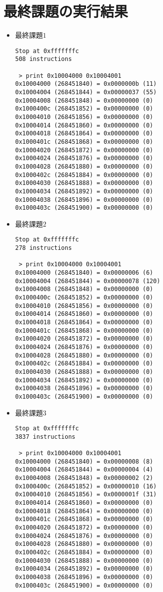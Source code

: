 \documentclass{jarticle}[11pt]
\begin{document}
\section{最終課題の実行結果}
\begin{itemize}
\item 最終課題$1$
\begin{verbatim}
Stop at 0xfffffffc
508 instructions

 > print 0x10004000 0x10004001
0x10004000 (268451840) = 0x0000000b (11)
0x10004004 (268451844) = 0x00000037 (55)
0x10004008 (268451848) = 0x00000000 (0)
0x1000400c (268451852) = 0x00000000 (0)
0x10004010 (268451856) = 0x00000000 (0)
0x10004014 (268451860) = 0x00000000 (0)
0x10004018 (268451864) = 0x00000000 (0)
0x1000401c (268451868) = 0x00000000 (0)
0x10004020 (268451872) = 0x00000000 (0)
0x10004024 (268451876) = 0x00000000 (0)
0x10004028 (268451880) = 0x00000000 (0)
0x1000402c (268451884) = 0x00000000 (0)
0x10004030 (268451888) = 0x00000000 (0)
0x10004034 (268451892) = 0x00000000 (0)
0x10004038 (268451896) = 0x00000000 (0)
0x1000403c (268451900) = 0x00000000 (0)
\end{verbatim}

\item 最終課題$2$
\begin{verbatim}
Stop at 0xfffffffc
278 instructions

 > print 0x10004000 0x10004001
0x10004000 (268451840) = 0x00000006 (6)
0x10004004 (268451844) = 0x00000078 (120)
0x10004008 (268451848) = 0x00000000 (0)
0x1000400c (268451852) = 0x00000000 (0)
0x10004010 (268451856) = 0x00000000 (0)
0x10004014 (268451860) = 0x00000000 (0)
0x10004018 (268451864) = 0x00000000 (0)
0x1000401c (268451868) = 0x00000000 (0)
0x10004020 (268451872) = 0x00000000 (0)
0x10004024 (268451876) = 0x00000000 (0)
0x10004028 (268451880) = 0x00000000 (0)
0x1000402c (268451884) = 0x00000000 (0)
0x10004030 (268451888) = 0x00000000 (0)
0x10004034 (268451892) = 0x00000000 (0)
0x10004038 (268451896) = 0x00000000 (0)
0x1000403c (268451900) = 0x00000000 (0)
\end{verbatim}

\item 最終課題$3$
\begin{verbatim}
Stop at 0xfffffffc
3837 instructions

 > print 0x10004000 0x10004001
0x10004000 (268451840) = 0x00000008 (8)
0x10004004 (268451844) = 0x00000004 (4)
0x10004008 (268451848) = 0x00000002 (2)
0x1000400c (268451852) = 0x00000010 (16)
0x10004010 (268451856) = 0x0000001f (31)
0x10004014 (268451860) = 0x00000000 (0)
0x10004018 (268451864) = 0x00000000 (0)
0x1000401c (268451868) = 0x00000000 (0)
0x10004020 (268451872) = 0x00000000 (0)
0x10004024 (268451876) = 0x00000000 (0)
0x10004028 (268451880) = 0x00000000 (0)
0x1000402c (268451884) = 0x00000000 (0)
0x10004030 (268451888) = 0x00000000 (0)
0x10004034 (268451892) = 0x00000000 (0)
0x10004038 (268451896) = 0x00000000 (0)
0x1000403c (268451900) = 0x00000000 (0)
\end{verbatim}


\end{itemize}
\end{document}
